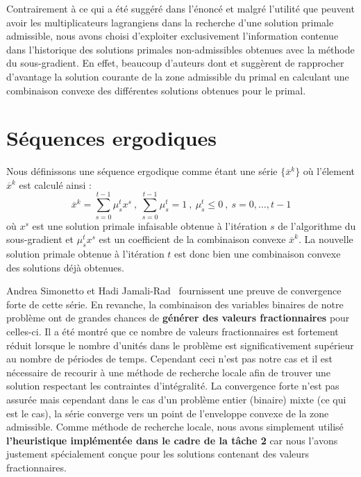 \vspace*{1.2cm}

Contrairement à ce qui a été suggéré dans l'énoncé et malgré l'utilité que peuvent avoir les multiplicateurs lagrangiens
dans la recherche d'une solution primale admissible, nous avons choisi d'exploiter exclusivement l'information
contenue dans l'historique des solutions primales non-admissibles obtenues avec la méthode du sous-gradient.
En effet, beaucoup d'auteurs dont \citep{doi:10.1137/S1052623498332336} et \citep{Zhuang1988}
suggèrent de rapprocher d'avantage la solution courante de la zone admissible du primal en calculant une combinaison
convexe des différentes solutions obtenues pour le primal.

\section{Séquences ergodiques}

Nous définissons une séquence ergodique comme étant une série $\{\overline{x}^k\}$ où l'élement $\overline{x}^k$
est calculé ainsi \citep{Aldenvik}:
\begin{equation}
    \overline{x}^k = \sum\limits_{s=0}^{t-1} \mu_s^t x^s \ , \ \sum\limits_{s=0}^{t-1} \mu_s^t = 1 \ , \ \mu_s^t \le 0 \ , \ s = 0, \ldots, t-1
\end{equation}
où $x^s$ est une solution primale infaisable obtenue à l'itération $s$ de l'algorithme du sous-gradient et $\mu_s^t x^s$ est un coefficient
de la combinaison convexe $\overline{x}^k$. La nouvelle solution primale obtenue à l'itération $t$ est donc bien une combinaison convexe 
des solutions déjà obtenues.

Andrea Simonetto et Hadi Jamali-Rad~\citep{Simonetto2016} fournissent une preuve de convergence forte de cette série.
En revanche, la combinaison des variables binaires de notre problème ont de grandes chances de \textbf{générer des valeurs fractionnaires} pour
celles-ci. Il a été montré que ce nombre de valeurs fractionnaires est fortement réduit lorsque le nombre d'unités dans le problème
est significativement supérieur au nombre de périodes de temps. Cependant ceci n'est pas notre cas et il est nécessaire de recourir à une 
méthode de recherche locale afin de trouver une solution respectant les contraintes d'intégralité.
La convergence forte n'est pas assurée mais cependant dans le cas d'un problème entier (binaire) mixte (ce qui est le cas), la série converge vers 
un point de l'enveloppe convexe de la zone admissible.
Comme méthode de recherche locale, nous avons simplement utilisé \textbf{l'heuristique implémentée dans le cadre de la tâche 2} car nous l'avons
justement spécialement conçue pour les solutions contenant des valeurs fractionnaires.

